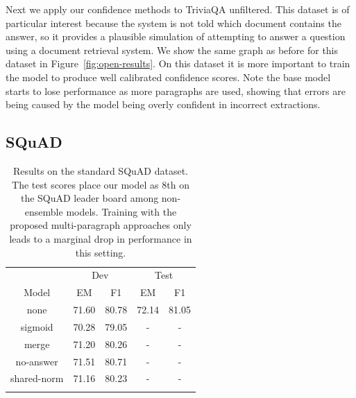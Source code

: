 \documentclass[11pt,a4paper]{article}
\begin{document}
Next we apply our confidence methods to TriviaQA unfiltered. 
This dataset is of particular interest because the system is not told which document contains the answer, so it provides a plausible simulation of attempting to answer a question using a document retrieval system.
We show the same graph as before for this dataset in Figure~\ref{fig:open-results}. On this dataset it is more important to train the model to produce well calibrated confidence scores. Note the base model starts to lose performance as more paragraphs are used, showing that errors are being caused by the model being overly confident in incorrect extractions. 

\subsection{SQuAD}
\addtocounter{footnote}{-1}

\label{sect:squad_results}


\label{sect:squad-results}
\begin{table}
\center
\begin{tabular}{ c | c | c | c | c}
\hhline{=====}
& \multicolumn{2}{c}{Dev} & \multicolumn{2}{c}{Test} \\
Model & EM & F1 & EM & F1 \\ \hline
none & 71.60 & 80.78 & 72.14 & 81.05 \\
sigmoid & 70.28 & 79.05 & - & -\\
merge & 71.20 & 80.26 & - & -\\
no-answer & 71.51 & 80.71 & - & -\\
shared-norm & 71.16 & 80.23 & - & -\\
\hhline{=====}
\end{tabular}
\caption{
Results on the standard SQuAD dataset. The test scores place our model as 8th on the SQuAD leader board among non-ensemble models\footnotemark. Training with the proposed multi-paragraph approaches only leads to a marginal drop in performance in this setting.}
\label{table:squad-paragraph}
\end{table}
\end{document}
